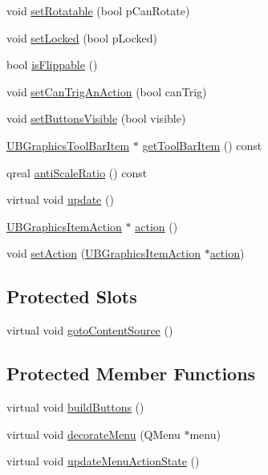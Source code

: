 \begin{DoxyCompactItemize}
void \hyperlink{class_u_b_graphics_item_delegate_aea85facebaec66edecbdf81280a9c918}{set\-Rotatable} (bool p\-Can\-Rotate)
\item 
void \hyperlink{class_u_b_graphics_item_delegate_ab2a23e50c385b6eb1069333c8f0eb23b}{set\-Locked} (bool p\-Locked)
\item 
bool \hyperlink{class_u_b_graphics_item_delegate_ae25633a784590906e9bcd62a45b7dcf9}{is\-Flippable} ()
\item 
void \hyperlink{class_u_b_graphics_item_delegate_a698c3af60576af37a916a93ee3a82a25}{set\-Can\-Trig\-An\-Action} (bool can\-Trig)
\item 
void \hyperlink{class_u_b_graphics_item_delegate_af6fb60f1a6f2c37ded1ea5392e7fbb11}{set\-Buttons\-Visible} (bool visible)
\item 
\hyperlink{class_u_b_graphics_tool_bar_item}{U\-B\-Graphics\-Tool\-Bar\-Item} $\ast$ \hyperlink{class_u_b_graphics_item_delegate_af64a99fb8ca196adcd2d7c1aacedb562}{get\-Tool\-Bar\-Item} () const 
\item 
qreal \hyperlink{class_u_b_graphics_item_delegate_a0cb52bb59aadb21de40ad65dc87fe87a}{anti\-Scale\-Ratio} () const 
\item 
virtual void \hyperlink{class_u_b_graphics_item_delegate_a25ea09abfab2c00bb19c08a995cd819e}{update} ()
\item 
\hyperlink{class_u_b_graphics_item_action}{U\-B\-Graphics\-Item\-Action} $\ast$ \hyperlink{class_u_b_graphics_item_delegate_ade01e0b179b501cc1c60451cbba96035}{action} ()
\item 
void \hyperlink{class_u_b_graphics_item_delegate_a3b597fdf7d09e24866416826075c4381}{set\-Action} (\hyperlink{class_u_b_graphics_item_action}{U\-B\-Graphics\-Item\-Action} $\ast$\hyperlink{class_u_b_graphics_item_delegate_ade01e0b179b501cc1c60451cbba96035}{action})
\end{DoxyCompactItemize}
\subsection*{Protected Slots}
\begin{DoxyCompactItemize}
\item 
virtual void \hyperlink{class_u_b_graphics_item_delegate_ae05eb9447f89914dd9a19bab0d8b0ef0}{goto\-Content\-Source} ()
\end{DoxyCompactItemize}
\subsection*{Protected Member Functions}
\begin{DoxyCompactItemize}
\item 
virtual void \hyperlink{class_u_b_graphics_item_delegate_afd35164da102e7acbb5d7dd097618a5c}{build\-Buttons} ()
\item 
virtual void \hyperlink{class_u_b_graphics_item_delegate_a37a264e2942f9d1a2f74fe2dd0d5c9b1}{decorate\-Menu} (Q\-Menu $\ast$menu)
\item 
virtual void \hyperlink{class_u_b_graphics_item_delegate_aaac5b391602a6c42ad371a3addf84662}{update\-Menu\-Action\-State} ()
\end{DoxyCompactItemize}
